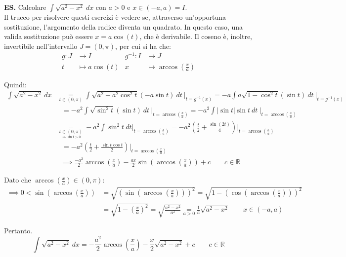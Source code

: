 \documentclass{article}
\begin{document}
\noindent\textbf{ES.} Calcolare $\int \sqrt{a^2 - x^2} \ dx$ con $a > 0$ e $x \in (-a, a) = I$.\\
Il trucco per risolvere questi esercizi è vedere se, attraverso un'opportuna sostituzione, l'argomento della radice diventa un quadrato. In questo caso, una valida sostituzione può essere $x = a\cos(t)$, che è derivabile. Il coseno è, inoltre, invertibile nell'intervallo $J = (0, \pi)$, per cui si ha che:
\begin{align*}
    g: J & \xrightarrow{} I & g^{-1}: I & \xrightarrow{} J \\
    t & \mapsto a\cos(t) & x & \mapsto \arccos\left(\frac{x}{a}\right)
\end{align*}

\noindent Quindi:
\begin{align*}
    \int \sqrt{a^2 - x^2} \ dx &\underset{t \in (0, \pi)}{=} \int \sqrt{a^2 - a^2\cos^2t}(-a\sin t) \ dt \ \bigg|_{t = g^{-1}(x)} = -a \int a\sqrt{1 - \cos^2t} (\sin t) \ dt \ \bigg|_{t = g^{-1}(x)}\\
    & \ \ \ = -a^2 \int \sqrt{\sin^2t}(\sin t) \ dt \ \bigg|_{t = \arccos(\frac{x}{a})} = -a^2 \int |\sin t| \sin t \ dt \ \bigg|_{t = \arccos(\frac{x}{a})} \\
    & \underset{\underset{\scriptstyle \Rightarrow  \sin t > 0}{t \in (0, \pi)}}{=} -a^2 \int \sin^2t \ dt \bigg|_{t = \arccos(\frac{x}{a})} = -a^2 \left(\frac{t}{2} + \frac{\sin(2t)}{4}\right) \bigg|_{t = \arccos(\frac{x}{a})} \\
    & \ \ \ = -a^2\left(\frac{t}{2} + \frac{\sin t\cos t}{2}\right) \bigg|_{t = \arccos(\frac{x}{a})} \\
    & \ \ \implies \frac{-a^2}{2}\arccos\left(\frac{x}{a}\right) - \frac{ax}{2} \sin\left(\arccos\left(\frac{x}{a}\right)\right) + c \qquad c \in \mathbb{R}
\end{align*}

\noindent Dato che $\arccos(\frac{x}{a}) \in (0, \pi)$:
\begin{align*}
    \implies 0 < \sin\left(\arccos\left(\frac{x}{a}\right)\right) &= \sqrt{\left(\sin\left(\arccos\left(\frac{x}{a}\right)\right)\right)^2} = \sqrt{1 - \left(\cos\left(\arccos\left(\frac{x}{a}\right)\right)\right)^2} \\
    &= \sqrt{1 - \left(\frac{x}{a}\right)^2} = \sqrt{\frac{a^2 - x^2}{a^2}} \underset{a > 0}{=} \frac{1}{a} \sqrt{a^2 - x^2} \qquad x \in (-a, a)
\end{align*}

\noindent Pertanto.
\begin{equation*}
    \int \sqrt{a^2 - x^2} \ dx = -\frac{a^2}{2}\arccos\left(\frac{x}{a}\right) - \frac{x}{2}\sqrt{a^2 - x^2} + c \qquad c \in \mathbb{R}
\end{equation*}
\end{document}
